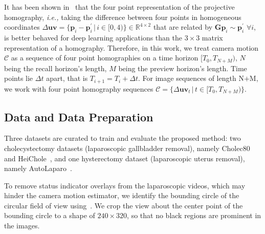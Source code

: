 It has been shown in~\cite{detone2016deep} that the four point representation of the projective homography, \emph{i.e.,}  taking the difference between four points in homogeneous coordinates $\Delta\mathbf{uv} = \{\mathbf{p}_i - \mathbf{p}^\prime_i\,|\,i \in [0, 4)\} \in \mathbb{R}^{4\times2}$ that are related by $\mathbf{G}\mathbf{p}_i \sim \mathbf{p}^\prime_i\,\,\forall i$, is better behaved for deep learning applications than the $3\times3$ matrix representation of a homography.
%
Therefore, in this work, we treat camera motion $\mathcal{C}$ as a sequence of four point homographies on a time horizon $[T_0, T_{N+M})$, $N$ being the recall horizon's length, $M$ being the preview horizon's length. Time points 
lie $\Delta t$ apart, that is $T_{i+1} = T_{i} + \Delta t$. For image sequences of length $\text{N+M}$,
we work with
four point homography sequences $\mathcal{C}=\{\Delta\mathbf{uv}_t \,|\, t\in[T_0, T_{N+M})\}$.



\subsection{Data and Data Preparation}
\label{c4:sec:data_and_data_preparation}
Three datasets are
curated
to train and evaluate the proposed method: two cholecystectomy datasets (laparoscopic gallbladder removal), namely Cholec80~\cite{twinanda2016endonet} and HeiChole~\cite{wagner2023comparative}, and one hysterectomy dataset (laparoscopic uterus removal), namely AutoLaparo~\cite{wang2022autolaparo}.


To remove status indicator overlays from the laparoscopic videos, which may hinder the camera motion estimator, we identify the bounding circle of the circular field of view using~\cite{Budd2022RapidDataset}. We crop the view about the center point of the bounding circle to a shape of $240\times320$, so that no black regions are prominent in the images.


